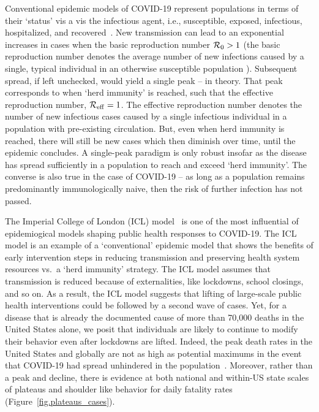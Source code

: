 Conventional epidemic
models of COVID-19 represent populations in terms of their `status' vis
a vis the infectious agent, i.e., susceptible, exposed, infectious,
hospitalized, and recovered~\citep{ferguson2020report,kucharski2020early,kissler_medrxiv2020,park_medrxiv2020,kraemer_2020sci,li_science2020,wu2020estimating}.
New transmission can lead to an exponential increases in cases 
when the basic reproduction number ${\cal{R}}_0>1$ (the
basic reproduction number denotes the average number of new
infections caused by a single, typical individual in an otherwise
susceptible population \citep{anderson1991infectious}).  Subsequent
spread, if left unchecked, would yield a single peak -- in theory. That 
peak corresponds to when `herd immunity' is reached, such
that the effective reproduction number, ${\cal{R}}_{\mathrm{eff}}=1$.
The effective reproduction number denotes the number of new
infectious cases caused by a single infectious individual
in a population with pre-existing circulation.
But, even when herd immunity is reached, there will still be new cases 
which then diminish over time, until the epidemic concludes.  
A single-peak paradigm is
only robust insofar as the disease has spread
sufficiently in a population to reach and exceed `herd immunity'.
The converse
is also true in the case of COVID-19 -- as long as 
a population remains predominantly immunologically
naive, then the risk of further infection has not passed. 

The Imperial College of London (ICL) model~\citep{ferguson2020report} is
one of the most influential of 
epidemiogical models shaping public health responses to COVID-19. The ICL model is an
example of a `conventional' epidemic model
that shows the benefits of  early intervention steps in reducing
transmission and preserving health system resources vs.~a `herd immunity' strategy.  
The ICL model assumes that
transmission is reduced because of externalities, like lockdowns,
school closings, and so on.  
As a result, the ICL model suggests that lifting of large-scale
public health interventions could be followed by a second wave of cases.
Yet, for a disease
that is already the documented cause of more than 70,000 deaths
in the United States alone, we posit that individuals
are likely to continue to modify
their behavior even after lockdowns are lifted.  
Indeed, the peak death rates in the United States and globally
are not as high as potential maximums in the event that
COVID-19 had spread unhindered in the population~\citep{ferguson2020report}. 
Moreover, rather than a peak and decline, there is evidence at both national
and within-US state scales of plateaus and shoulder like
behavior for daily fatality rates (Figure~\ref{fig.plateaus_cases}).   

